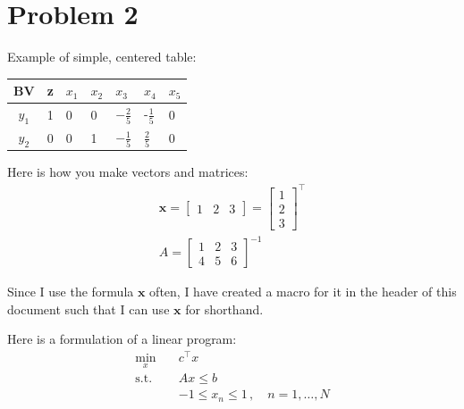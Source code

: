 \documentclass{article}
\newcommand{\xx}{\mathbf x}
\begin{document}
\pagebreak
\section*{Problem 2}

Example of simple, centered table:

\begin{table}[h!]
\centering
    \begin{tabular}{c | llllll }
        \toprule
         BV  & z & $x_1$ & $x_2$ & $x_3$ & $x_4$ & $x_5$  \\ 
         \midrule %
         $y_1$   & 1 & 0 & 0 & $-\frac{2}{5}$ & -$\frac{1}{5}$ & 0  \\
         $y_2$ & 0 & 0 & 1 & $-\frac{1}{5}$ & $\frac{2}{5}$  & 0  \\
        \bottomrule
    \end{tabular}
\end{table}



Here is how you make vectors and matrices:
\begin{align}
    \xx = \begin{bmatrix} 1 & 2 & 3 \end{bmatrix} = \begin{bmatrix} 1 \\ 2 \\ 3 \end{bmatrix}^\top \\
    A = \begin{bmatrix} 1 & 2 & 3 \\ 4 & 5 & 6 \end{bmatrix}^{-1}
\end{align}

Since I use the formula $\mathbf x$ often, I have created a macro for it in the header of this document such that I can use $\xx$ for shorthand.

Here is a formulation of a linear program:
\begin{align}
    \min_{x} \quad & c^\top x \\
    \mathrm{s.t.} \quad 
    & A x \leq b \\
    &-1 \leq x_n \leq 1 \,, \quad n = 1, \dots, N
\end{align}

\clearpage
\newpage
\end{document}
